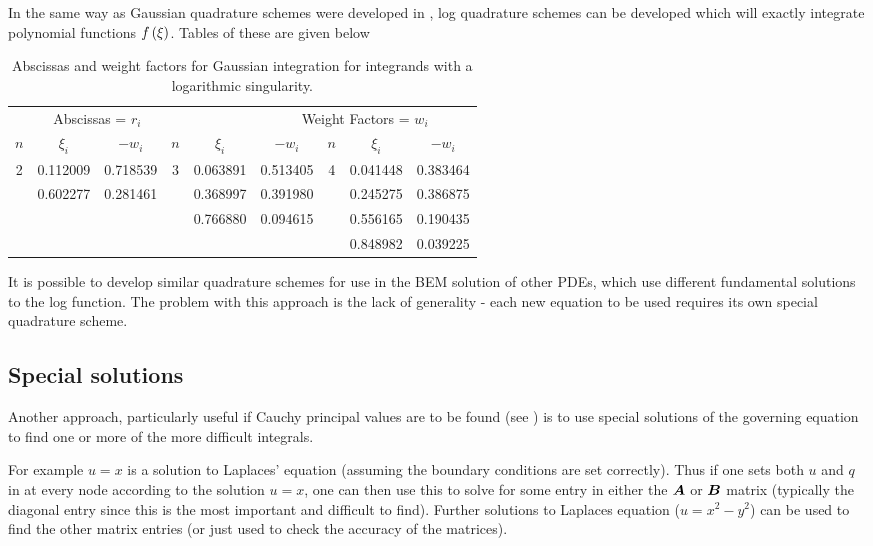 In the same way as Gaussian quadrature schemes were developed in
, log quadrature schemes can be developed which will exactly
integrate polynomial functions $ f\left( \xi \right) $. Tables of these are given below
\begin{table}[htbp] \centering
  \begin{tabular}{ccccccccc}
    \multicolumn{4}{c}{Abscissas = $r_{i}$} & \multicolumn{1}{c}{ } &
    \multicolumn{4}{c}{Weight Factors = $w_{i}$} \\
    $n$ & $\xi_{i}$ & $-w_{i}$ & $n$ &  $\xi_{i}$ & $-w_{i}$ & $n$ & 
    $\xi_{i}$ & $-w_{i}$ \\
    2 & 0.112009 & 0.718539 & 3 & 0.063891 & 0.513405 & 4 & 0.041448 &
    0.383464 \\
    & 0.602277 & 0.281461 & & 0.368997 & 0.391980 & & 0.245275 & 0.386875 \\
    & & & & 0.766880 & 0.094615 & & 0.556165 & 0.190435 \\
    & & & & & & & 0.848982 & 0.039225
  \end{tabular}
  \caption{Abscissas and weight factors for Gaussian integration for
    integrands with a logarithmic singularity.}
  \label{table:abscissas}
\end{table}
  
It is possible to develop similar quadrature schemes for use in the BEM 
solution of other PDEs, which use different fundamental solutions to the log 
function.  The problem with this approach is the lack of generality - each new equation to be used requires its own special quadrature scheme.     

\subsection{Special solutions}

Another approach, particularly useful if Cauchy principal values are to be
found (see ) is to use special solutions of the
governing equation to find one or more of the more difficult integrals.

For example $u=x$ is a solution to Laplaces' equation (assuming the boundary
conditions are set correctly). Thus if one sets both $u$ and $q$ in 
at every node according to the solution $u=x$, one can then use this to solve
for some entry in either the $\matr{A}$ or $\matr{B}$ matrix (typically the
diagonal entry since this is the most important and difficult to
find). Further solutions to Laplaces equation (\eg $u=x^2-y^2$) can be used to
find the other matrix entries (or just used to check the accuracy of the matrices).


